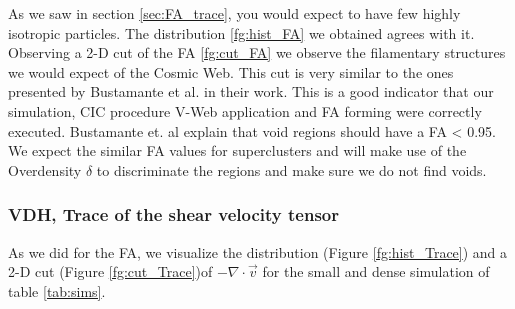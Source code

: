 \documentclass[12pt]{article}
\begin{document}
\begin{par}
As we saw in section \ref{sec:FA_trace}, you would
 expect to have few highly isotropic particles.
  The distribution \ref{fg:hist_FA} we obtained
   agrees with it.\\
Observing a 2-D cut of the FA \ref{fg:cut_FA} we
 observe the filamentary structures we would
  expect of the Cosmic Web. This cut is very
   similar to the ones presented by  Bustamante et
   al.  \cite{bustamante_tensor_2015} in their
    work. This is a good indicator that our
     simulation, CIC procedure V-Web application
      and FA forming were correctly executed.
       Bustamante et. al  explain that void
        regions should have a FA < 0.95. We expect
         the similar FA values for superclusters
          and will make use of the Overdensity
           $\delta$ to discriminate the    
            regions and make sure we do not find
             voids.

\end{par}


\subsubsection{VDH, Trace of the shear velocity tensor}
As we did for the FA, we visualize the
 distribution (Figure \ref{fg:hist_Trace}) and a
  2-D cut (Figure \ref{fg:cut_Trace})of $-\nabla
   \cdot \vec{v}$ for the small and dense
    simulation of table \ref{tab:sims}.
\end{document}
